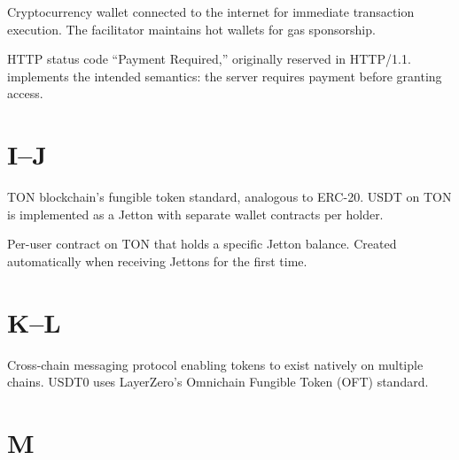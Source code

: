 \begin{description}[style=nextline]

\item[Hot Wallet]
Cryptocurrency wallet connected to the internet for immediate transaction execution. The facilitator maintains hot wallets for gas sponsorship.

\item[HTTP 402]
HTTP status code ``Payment Required,'' originally reserved in HTTP/1.1. \tprotocol{} implements the intended semantics: the server requires payment before granting access.

\end{description}

\section*{I--J}

\begin{description}[style=nextline]

\item[Jetton]
TON blockchain's fungible token standard, analogous to ERC-20. USDT on TON is implemented as a Jetton with separate wallet contracts per holder.

\item[Jetton Wallet]
Per-user contract on TON that holds a specific Jetton balance. Created automatically when receiving Jettons for the first time.

\end{description}

\section*{K--L}

\begin{description}[style=nextline]

\item[LayerZero]
Cross-chain messaging protocol enabling tokens to exist natively on multiple chains. USDT0 uses LayerZero's Omnichain Fungible Token (OFT) standard.

\end{description}

\section*{M}

